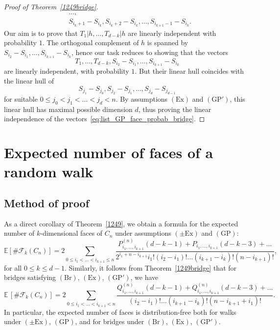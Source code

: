 \documentclass[12pt, reqno]{amsart}
\theoremstyle{plain}
\theoremstyle{definition}
\theoremstyle{remark}
\begin{document}
\begin{proof}[Proof of Theorem~\ref{1249bridge}]
\begin{align*}
&\ldots,\\
&S_{i_k+1} - S_{i_k}, S_{i_k+2} - S_{i_k}, \ldots,S_{i_{k+1}-1} - S_{i_k}.
\end{align*}
Our aim is to prove that $T_1|h,\ldots, T_{d-k}|h$ are linearly independent with probability $1$. The orthogonal complement of $h$ is spanned by $S_{i_2}-S_{i_1},\ldots, S_{i_{k+1}} - S_{i_k}$, hence our task reduces to showing that the vectors
\begin{equation}\label{eq:list_GP_face_probab_bridge}
T_1,\ldots,T_{d-k}, S_{i_2}-S_{i_1},\ldots, S_{i_{k+1}} - S_{i_k}
\end{equation}
are linearly independent, with probability $1$. But their linear hull coincides with the linear hull of
$$
S_{j_1}-S_{j_0}, S_{j_2}-S_{j_1}, \ldots, S_{j_d}-S_{j_{d-1}}
$$
for suitable $0\leq j_0< j_1 <\ldots < j_d < n$. By assumptions $(\text{Ex})$ and $(\text{GP}')$, this linear hull has maximal possible dimension $d$, thus proving the linear independence of the vectors~\eqref{eq:list_GP_face_probab_bridge}.
\end{proof}

\section{Expected number of faces of a random walk}
\subsection{Method of proof}
As a direct corollary of Theorem~\ref{1249}, we obtain a formula for the expected number of $k$-dimensional faces of $C_n$ under assumptions $(\pm\text{Ex})$ and $(\text{GP})$:
\begin{equation}\label{eq:expect_faces_walk_big_sum}
{\mathbb E} [\#\mathcal{F}_k(C_n)]
=
2\sum_{0\leq i_1<\ldots<i_{k+1}\leq n}\frac{P_{i_1,\ldots,i_{k+1}}^{(n)}(d-k-1) + P_{i_1,\ldots,i_{k+1}}(d-k-3)+\ldots}{2^{i_1+n-i_{k+1}} i_1!(i_2-i_1)!\ldots  (i_{k+1}-i_k)! (n-i_{k+1})!},
\end{equation}
for all $0\leq k\leq d-1$.  Similarly, it follows from Theorem~\ref{1249bridge} that for bridges satisfying $(\text{Br})$, $(\text{Ex})$, $(\text{GP}')$, we have
\begin{equation}\label{eq:expect_faces_bridge_big_sum}
{\mathbb E}\, [\#\mathcal{F}_k(C_n)  ]
=
2 \sum_{0\leq i_1<\ldots<i_{k+1} < n}\frac{Q_{i_1,\ldots,i_{k+1}}^{(n)}(d-k-1) + Q_{i_1,\ldots,i_{k+1}}^{(n)}(d-k-3)+\ldots}{(i_2-i_1)!\ldots  (i_{k+1}-i_k)! (n-i_{k+1}+i_1)!}.
\end{equation}
In particular, the expected number of faces is distribution-free both for walks under $(\pm\text{Ex})$, $(\text{GP})$, and for bridges under  $(\text{Br})$, $(\text{Ex})$, $(\text{GP}')$.
\end{document}
